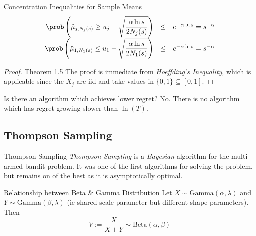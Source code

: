 \documentclass[11pt,a4paper]{article}
\begin{document}
\begin{theorem}{Concentration Inequalities for Sample Means}
  \[\begin{array}{rcl}
  \displaystyle\prob\left(\hat\mu_{j,N_j(s)}\geq u_j+\sqrt\frac{\alpha\ln s}{2N_j(s)}\right)&\leq&e^{-\alpha\ln s}=s^{-\alpha}\\
  \displaystyle\prob\left(\hat\mu_{1,N_1(s)}\leq u_1-\sqrt\frac{\alpha\ln s}{2N_1(s)}\right)&\leq&e^{-\alpha\ln s}=s^{-\alpha}
  \end{array}\]
\end{theorem}

\begin{proof}{Theorem 1.5}
  The proof is immediate from \textit{Hoeffding's Inequality}, which is applicable since the $X_j$ are iid and take values in $\{0,1\}\subseteq[0,1]$.
\end{proof}

\begin{remark}{Is there an algorithm which achieves lower regret?}
  No. There is no algorithm which has regret growing slower than $\ln(T)$.
\end{remark}

\subsection{Thompson Sampling}

\begin{remark}{Thompson Sampling}
  \textit{Thompson Sampling} is a \textit{Bayesian} algorithm for the multi-armed bandit problem. It was one of the first algorithms for solving the problem, but remains on of the best as it is asymptotically optimal.
\end{remark}

\begin{theorem}{Relationship between Beta \& Gamma Distribution}
  Let $X\sim\text{Gamma}(\alpha,\lambda)$ and $Y\sim\text{Gamma}(\beta,\lambda)$ (ie shared scale parameter but different shape parameters). Then
  \[ V:=\frac{X}{X+Y}\sim\text{Beta}(\alpha,\beta) \]
\end{theorem}
\end{document}

